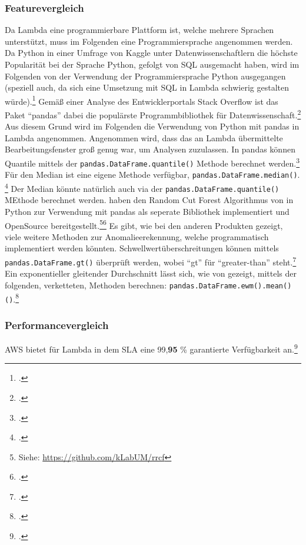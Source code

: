 \subsubsection{Featurevergleich}
Da Lambda eine programmierbare Plattform ist, welche mehrere Sprachen unterstützt, muss im Folgenden eine Programmiersprache angenommen werden. Da Python in einer Umfrage von Kaggle unter Datenwissenschaftlern die höchste Popularität bei der Sprache Python, gefolgt von \ac{SQL} ausgemacht haben, wird im Folgenden von der Verwendung der Programmiersprache Python ausgegangen (speziell auch, da sich eine Umsetzung mit \ac{SQL} in Lambda schwierig gestalten würde).\footcite[Vgl.][]{Hayes.2020} Gemäß einer Analyse des Entwicklerportals Stack Overflow ist das Paket \enquote{pandas} dabei die populärste Programmbibliothek für Datenwissenschaft.\footcite[Vgl.][]{Robinson.2017} Aus diesem Grund wird im Folgenden die Verwendung von Python mit pandas in Lambda angenommen. Angenommen wird, dass das an Lambda übermittelte Bearbeitungsfenster groß genug war, um Analysen zuzulassen.
\newcommand{\pandasmethod}[1]{\texttt{pandas.#1()}}
In pandas können Quantile mittels der \pandasmethod{DataFrame.quantile} Methode berechnet werden.\footcite[Vgl.][]{o.V..o.J.c} Für den Median ist eine eigene Methode verfügbar, \pandasmethod{DataFrame.median}. \footcite[Vgl.][]{o.V..o.J.d} Der Median könnte natürlich auch via der \pandasmethod{DataFrame.quantile} MEthode berechnet werden.
\citeauthor{Bartos.2019} haben den Random Cut Forest Algorithmus von \citeauthor{Guha.2016} in Python zur Verwendung mit pandas als seperate Bibliothek implementiert und OpenSource bereitgestellt.\footnote{Siehe: \url{https://github.com/kLabUM/rrcf}}\nzitat\footcite[Vgl.][]{Bartos.2019} Es gibt, wie bei den anderen Produkten gezeigt, viele weitere Methoden zur Anomalieerekennung, welche programmatisch implementiert werden könnten.
Schwellwertüberschreitungen können mittels \pandasmethod{DataFrame.gt} überprüft werden, wobei \enquote{gt} für \enquote{greater-than} steht.\footcite[Vgl.][]{o.V..o.J.e}
Ein exponentieller gleitender Durchschnitt lässt sich, wie von \citeauthor{Sharma.2019} gezeigt, mittels der folgenden, verketteten, Methoden berechnen: \pandasmethod{DataFrame.ewm().mean()}.\footcite[Vgl.][]{Sharma.2019} 

\subsubsection{Performancevergleich}
\ac{AWS} bietet für Lambda in dem \ac{SLA} eine 99,\textbf{95} \% garantierte Verfügbarkeit an.\footcite[Vgl.][]{AmazonWebServicesInc..2019d}

